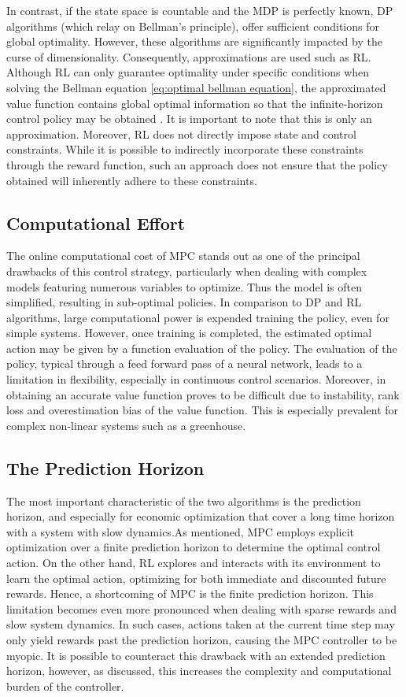 In contrast, if the state space is countable and the MDP is perfectly known, DP algorithms (which relay on Bellman's principle), offer sufficient conditions for global optimality. However, these algorithms are significantly impacted by the curse of dimensionality. Consequently, approximations are used such as RL. 
Although RL can only guarantee optimality under specific conditions when solving the Bellman equation \autoref{eq:optimal bellman equation}, the approximated value function contains global optimal information so that the infinite-horizon control policy may be obtained \cite{linReinforcementLearningBasedModel2023}. It is important to note that this is only an approximation. Moreover, RL does not directly impose state and control constraints. While it is possible to indirectly incorporate these constraints through the reward function, such an approach does not ensure that the  policy obtained will inherently adhere to these constraints. 

\subsection{Computational Effort}
 The online computational cost of MPC stands out as one of the principal drawbacks of this control strategy, particularly when dealing with complex models featuring numerous variables to optimize. Thus the model is often simplified, resulting in sub-optimal policies. In comparison to DP and RL algorithms, large computational power is expended training the policy, even for simple systems. However, once training is completed, the estimated optimal action may be given by a function evaluation of the policy. The evaluation of the policy, typical through a feed forward pass of a neural network, leads to a limitation in flexibility, especially in continuous control scenarios. Moreover, in obtaining an accurate value function proves to be difficult due to instability, rank loss and overestimation bias of the value function. This is especially prevalent for complex non-linear systems such as a greenhouse.
 
\subsection{The Prediction Horizon}
The most important characteristic of the two algorithms is the prediction horizon, and especially for economic optimization that cover a long time horizon with a system with slow dynamics.As mentioned, MPC employs explicit optimization over a finite prediction horizon to determine the optimal control action. On the other hand, RL explores and interacts with its environment to learn the optimal action, optimizing for both immediate and discounted future rewards.
Hence, a shortcoming of MPC is the finite prediction horizon. This limitation becomes even more pronounced when dealing with sparse rewards and slow system dynamics. In such cases, actions taken at the current time step may only yield rewards past the prediction horizon, causing the MPC controller to be myopic. It is possible to counteract this drawback with an extended prediction horizon, however, as discussed, this increases the complexity and computational burden of the controller.

